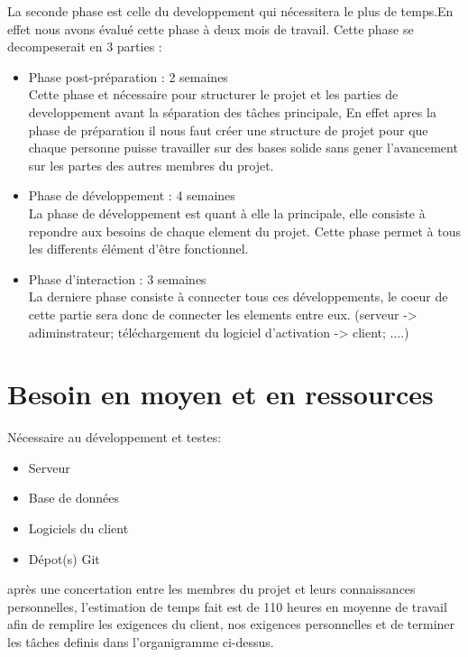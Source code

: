 La seconde phase est celle du developpement qui nécessitera le plus de temps.En effet nous avons évalué cette phase à deux mois de travail.
Cette phase se decompeserait en 3 parties : \newline

\begin{itemize}
	\item Phase post-préparation : 2 semaines\\ 
	Cette phase et nécessaire pour structurer le projet et les parties de developpement avant la séparation des tâches principale, En effet apres la phase de préparation 
	il nous faut créer une structure de projet pour que chaque personne puisse travailler sur des bases solide sans gener l'avancement sur les partes des 
	autres membres du projet. \newline
	\item Phase de développement : 4 semaines\\
	La phase de développement est quant à elle la principale, elle consiste à repondre aux besoins de chaque element du projet. Cette phase permet 
	à tous les differents élément d'être fonctionnel.
	\item Phase d'interaction : 3 semaines\\
	La derniere phase consiste à connecter tous ces développements, le coeur de cette partie sera donc de connecter les elements entre eux. (serveur -> adiminstrateur; téléchargement du logiciel d'activation -> client; ....)
\end{itemize}
\newpage
\section{Besoin en moyen et en ressources}
Nécessaire au développement et testes:
\begin{itemize}
	\item Serveur
	\item Base de données
	\item Logiciels du client
	\item Dépot(s) Git \\ \newline
\end{itemize}
après une concertation entre les membres du projet et leurs connaissances personnelles, l'estimation de temps fait est de
  110 heures en moyenne de travail afin de remplire les exigences du client, nos exigences personnelles et de terminer les tâches definis
	dans l'organigramme ci-dessus.\\ \newline

